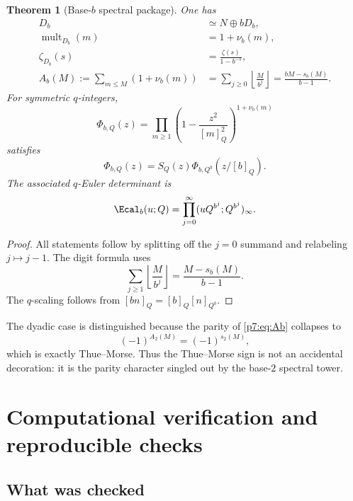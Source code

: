 \documentclass[11pt]{article}
\numberwithin{equation}{section}
\newtheorem{theorem}{Theorem}[section]
\theoremstyle{definition}
\theoremstyle{remark}
\begin{document}
\begin{theorem}[Base-$b$ spectral package]\label{p7:thm:base-b}
One has
\begin{align}
 D_b&\simeq N\oplus bD_b,\label{p7:eq:Db-scale}\\
 \operatorname{mult}_{D_b}(m)&=1+\nu_b(m),\label{p7:eq:mb}\\
 \zeta_{D_b}(s)&=\frac{\zeta(s)}{1-b^{-s}},\label{p7:eq:zetab}\\
 A_b(M):=\sum_{m\le M}(1+\nu_b(m))
 &=\sum_{j\ge0}\left\lfloor\frac{M}{b^j}\right\rfloor
 =\frac{bM-s_b(M)}{b-1}.\label{p7:eq:Ab}
\end{align}
For symmetric $q$-integers,
\begin{equation}\label{p7:eq:PhibQ}
 \Phi_{b,Q}(z)=\prod_{m\ge1}
 \left(1-\frac{z^2}{[m]_Q^2}\right)^{1+\nu_b(m)}
\end{equation}
satisfies
\begin{equation}\label{p7:eq:PhibQ-scale}
 \Phi_{b,Q}(z)=S_Q(z)
 \Phi_{b,Q^b}\!\left(z/[b]_Q\right).
\end{equation}
The associated $q$-Euler determinant is
\begin{equation}\label{p7:eq:Eb}
 \Ecal_b(u;Q)=\prod_{j=0}^{\infty}
 (uQ^{b^j};Q^{b^j})_\infty.
\end{equation}
\end{theorem}

\begin{proof}
All statements follow by splitting off the $j=0$ summand and relabeling $j\mapsto j-1$.  The digit formula uses
\[
 \sum_{j\ge1}\left\lfloor\frac{M}{b^j}\right\rfloor
 =\frac{M-s_b(M)}{b-1}.
\]
The $q$-scaling follows from $[bn]_Q=[b]_Q[n]_{Q^b}$.
\end{proof}

The dyadic case is distinguished because the parity of \cref{p7:eq:Ab} collapses to
\[
 (-1)^{A_2(M)}=(-1)^{s_2(M)},
\]
which is exactly Thue--Morse.  Thus the Thue--Morse sign is not an accidental decoration: it is the parity character singled out by the base-$2$ spectral tower.

\section{Computational verification and reproducible checks}

\subsection{What was checked}
\end{document}
